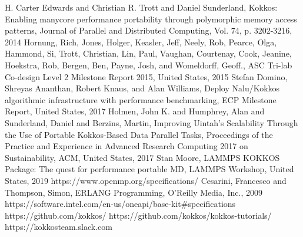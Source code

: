 \documentclass[conference]{IEEEtran}
\begin{document}
\begin{thebibliography}{00}
 H. Carter Edwards and Christian R. Trott and Daniel Sunderland, 
Kokkos: Enabling manycore performance portability through polymorphic memory access patterns, Journal of Parallel and Distributed Computing, Vol. 74, p. 3202-3216, 2014
 Hornung, Rich, Jones, Holger, Keasler, Jeff, Neely, Rob, Pearce, Olga, Hammond, Si, Trott, Christian, Lin, Paul, Vaughan, Courtenay, Cook, Jeanine, Hoekstra, Rob, Bergen, Ben, Payne, Josh, and Womeldorff, Geoff., ASC Tri-lab Co-design Level 2 Milestone Report 2015, United States, 2015
 Stefan Domino, Shreyas Ananthan, Robert Knaus, and Alan Williams, 
Deploy Nalu/Kokkos algorithmic infrastructure with performance benchmarking, ECP Milestone Report, United States, 2017
 Holmen, John K. and Humphrey, Alan and Sunderland, Daniel and Berzins, Martin, Improving Uintah’s Scalability Through the Use of Portable Kokkos-Based Data Parallel Tasks, Proceedings of the Practice and Experience in Advanced Research Computing 2017 on Sustainability, ACM, United States, 2017
 Stan Moore, LAMMPS KOKKOS Package: The quest for performance portable MD, LAMMPS Workshop, United States, 2019
 https://www.openmp.org/specifications/
 Cesarini, Francesco and Thompson, Simon, ERLANG Programming, O’Reilly Media, Inc., 2009
 https://software.intel.com/en-us/oneapi/base-kit\#specifications
 https://github.com/kokkos/
 https://github.com/kokkos/kokkos-tutorials/
 https://kokkosteam.slack.com
\end{thebibliography}
\end{document}
